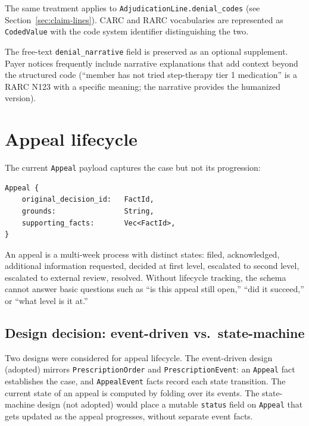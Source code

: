 \documentclass[11pt]{article}
\begin{document}
The same treatment applies to \texttt{AdjudicationLine.denial\_codes}
(see Section~\ref{sec:claim-lines}). CARC and RARC vocabularies are
represented as \texttt{CodedValue} with the code system identifier
distinguishing the two.

The free-text \texttt{denial\_narrative} field is preserved as an
optional supplement. Payer notices frequently include narrative
explanations that add context beyond the structured code (``member has
not tried step-therapy tier 1 medication'' is a RARC N123 with a
specific meaning; the narrative provides the humanized version).

\section{Appeal lifecycle}
\label{sec:appeal-lifecycle}

The current \texttt{Appeal} payload captures the case but not its
progression:

\begin{lstlisting}
Appeal {
    original_decision_id:   FactId,
    grounds:                String,
    supporting_facts:       Vec<FactId>,
}
\end{lstlisting}

An appeal is a multi-week process with distinct states: filed,
acknowledged, additional information requested, decided at first level,
escalated to second level, escalated to external review, resolved.
Without lifecycle tracking, the schema cannot answer basic questions
such as ``is this appeal still open,'' ``did it succeed,'' or ``what
level is it at.''

\subsection{Design decision: event-driven vs.\ state-machine}

Two designs were considered for appeal lifecycle. The event-driven
design (adopted) mirrors \texttt{PrescriptionOrder} and
\texttt{PrescriptionEvent}: an \texttt{Appeal} fact establishes the
case, and \texttt{AppealEvent} facts record each state transition. The
current state of an appeal is computed by folding over its events. The
state-machine design (not adopted) would place a mutable \texttt{status}
field on \texttt{Appeal} that gets updated as the appeal progresses,
without separate event facts.
\end{document}
